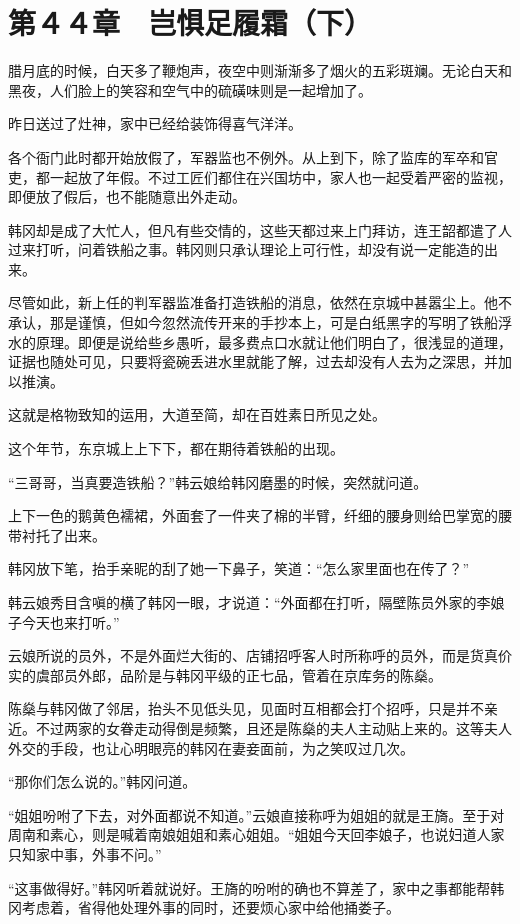 \section{第４４章　岂惧足履霜（下）}

腊月底的时候，白天多了鞭炮声，夜空中则渐渐多了烟火的五彩斑斓。无论白天和黑夜，人们脸上的笑容和空气中的硫磺味则是一起增加了。

昨日送过了灶神，家中已经给装饰得喜气洋洋。

各个衙门此时都开始放假了，军器监也不例外。从上到下，除了监库的军卒和官吏，都一起放了年假。不过工匠们都住在兴国坊中，家人也一起受着严密的监视，即便放了假后，也不能随意出外走动。

韩冈却是成了大忙人，但凡有些交情的，这些天都过来上门拜访，连王韶都遣了人过来打听，问着铁船之事。韩冈则只承认理论上可行性，却没有说一定能造的出来。

尽管如此，新上任的判军器监准备打造铁船的消息，依然在京城中甚嚣尘上。他不承认，那是谨慎，但如今忽然流传开来的手抄本上，可是白纸黑字的写明了铁船浮水的原理。即便是说给些乡愚听，最多费点口水就让他们明白了，很浅显的道理，证据也随处可见，只要将瓷碗丢进水里就能了解，过去却没有人去为之深思，并加以推演。

这就是格物致知的运用，大道至简，却在百姓素日所见之处。

这个年节，东京城上上下下，都在期待着铁船的出现。

“三哥哥，当真要造铁船？”韩云娘给韩冈磨墨的时候，突然就问道。

上下一色的鹅黄色襦裙，外面套了一件夹了棉的半臂，纤细的腰身则给巴掌宽的腰带衬托了出来。

韩冈放下笔，抬手亲昵的刮了她一下鼻子，笑道：“怎么家里面也在传了？”

韩云娘秀目含嗔的横了韩冈一眼，才说道：“外面都在打听，隔壁陈员外家的李娘子今天也来打听。”

云娘所说的员外，不是外面烂大街的、店铺招呼客人时所称呼的员外，而是货真价实的虞部员外郎，品阶是与韩冈平级的正七品，管着在京库务的陈燊。

陈燊与韩冈做了邻居，抬头不见低头见，见面时互相都会打个招呼，只是并不亲近。不过两家的女眷走动得倒是频繁，且还是陈燊的夫人主动贴上来的。这等夫人外交的手段，也让心明眼亮的韩冈在妻妾面前，为之笑叹过几次。

“那你们怎么说的。”韩冈问道。

“姐姐吩咐了下去，对外面都说不知道。”云娘直接称呼为姐姐的就是王旖。至于对周南和素心，则是喊着南娘姐姐和素心姐姐。“姐姐今天回李娘子，也说妇道人家只知家中事，外事不问。”

“这事做得好。”韩冈听着就说好。王旖的吩咐的确也不算差了，家中之事都能帮韩冈考虑着，省得他处理外事的同时，还要烦心家中给他捅娄子。

